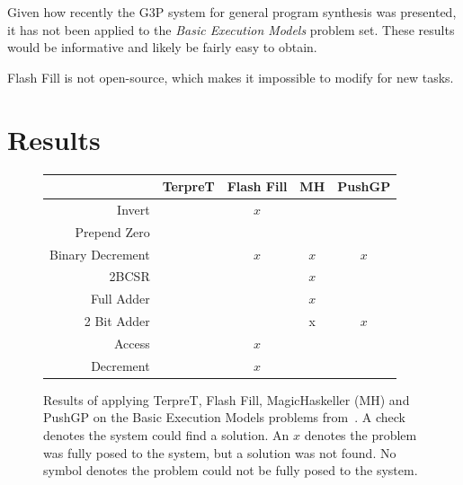Given how recently the G3P system for general program synthesis was presented, it has not been applied to the \emph{Basic Execution Models} problem set. These results would be informative and likely be fairly easy to obtain.

Flash Fill is not open-source, which makes it impossible to modify for new tasks.

\section{Results}

\begin{figure}
\begin{tabular}{ r | c c c c }
	& TerpreT & Flash Fill & MH & PushGP \\
	\hline
	Invert & \checkmark & $x$ & \checkmark & \checkmark \\
	Prepend Zero & \checkmark & \checkmark & \checkmark & \checkmark \\
	Binary Decrement & \checkmark & $x$ & $x$ & $x$ \\
	2BCSR & \checkmark &  & $x$ & \checkmark \\
	Full Adder & \checkmark &  & $x$ & \checkmark \\
	2 Bit Adder & \checkmark &  & x & $x$ \\
	Access & \checkmark & $x$ & \checkmark & \checkmark \\
	Decrement & \checkmark & $x$ & \checkmark & \checkmark \\
\end{tabular}
\caption{Results of applying TerpreT, Flash Fill, MagicHaskeller (MH) and PushGP on the Basic Execution Models problems from~\cite{Gaunt2016}.  A check denotes the system could find a solution. An $x$ denotes the problem was fully posed to the system, but a solution was not found. No symbol denotes the problem could not be fully posed to the system.}
\label{fig:results1}
\end{figure}

